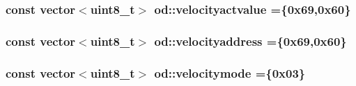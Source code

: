 \subsubsection[{\texorpdfstring{velocityactvalue}{velocityactvalue}}]{\setlength{\rightskip}{0pt plus 5cm}const vector$<$uint8\+\_\+t$>$ od\+::velocityactvalue =\{0x69,0x60\}}\hypertarget{namespaceod_ad2c386d1f9bfc49b8a247f0b093f8963}{}\label{namespaceod_ad2c386d1f9bfc49b8a247f0b093f8963}
\subsubsection[{\texorpdfstring{velocityaddress}{velocityaddress}}]{\setlength{\rightskip}{0pt plus 5cm}const vector$<$uint8\+\_\+t$>$ od\+::velocityaddress =\{0x69,0x60\}}\hypertarget{namespaceod_adf45781fb80275c184d548ea793b376b}{}\label{namespaceod_adf45781fb80275c184d548ea793b376b}
\subsubsection[{\texorpdfstring{velocitymode}{velocitymode}}]{\setlength{\rightskip}{0pt plus 5cm}const vector$<$uint8\+\_\+t$>$ od\+::velocitymode =\{0x03\}}\hypertarget{namespaceod_a2771fb30adf397c1cd2ddb092a414e82}{}\label{namespaceod_a2771fb30adf397c1cd2ddb092a414e82}
